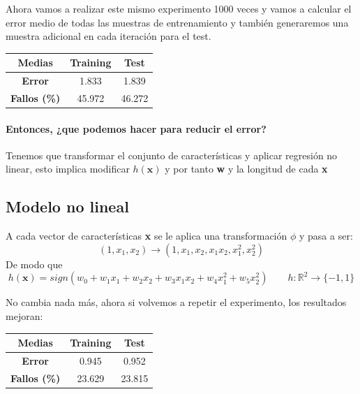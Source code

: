 \documentclass{article}
\begin{document}
    Ahora vamos a realizar este mismo experimento 1000 veces y vamos a calcular el error medio de todas las muestras
    de entrenamiento y también generaremos una muestra adicional en cada iteración para el test.

    \begin{center}
        \begin{tabular}{ |c|c|c| }
            \hline
            Medias & \textbf{Training} & \textbf{Test} \\
            \hline
            \textbf{Error} & 1.833 & 1.839 \\
            \hline
            \textbf{Fallos (\%)} & 45.972 & 46.272 \\
            \hline
        \end{tabular}
    \end{center}

    \paragraph*{\textbf{Entonces, ¿que podemos hacer para reducir el error?}}Tenemos que transformar el conjunto de características
    y aplicar regresión no linear, esto implica modificar $h(\textbf{x})$ y por tanto \textbf{w} y la longitud de cada
    \textbf{x}

    \pagebreak

    \subsection{Modelo no lineal}
    A cada vector de características \textbf{x} se le aplica una transformación $\phi$ y pasa a ser:
    \begin{equation*}
        (1,x_1,x_2) \to (1,x_1,x_2,x_1x_2,x_1^2,x_2^2)
    \end{equation*}
    De modo que
    \begin{equation*}
        h(\textbf{x}) = sign(w_0 + w_1x_1 + w_2x_2 + w_3x_1x_2 + w_4x_1^2 + w_5x_2^2) \qquad h:\mathbb{R}^2 \to \{-1,1\}
    \end{equation*}

    No cambia nada más, ahora si volvemos a repetir el experimento, los resultados mejoran:
    \begin{center}
        \begin{tabular}{ |c|c|c| }
            \hline
            Medias & \textbf{Training} & \textbf{Test} \\
            \hline
            \textbf{Error} & 0.945 & 0.952 \\
            \hline
            \textbf{Fallos (\%)} & 23.629 & 23.815 \\
            \hline
        \end{tabular}
    \end{center}
\end{document}

